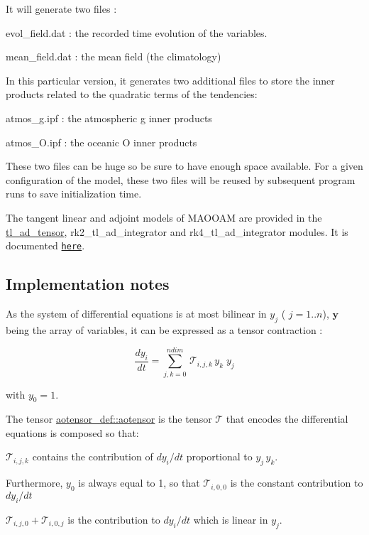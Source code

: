 It will generate two files \+:
\begin{DoxyItemize}
\item evol\+\_\+field.\+dat \+: the recorded time evolution of the variables.
\item mean\+\_\+field.\+dat \+: the mean field (the climatology)
\end{DoxyItemize}

In this particular version, it generates two additional files to store the inner products related to the quadratic terms of the tendencies\+:
\begin{DoxyItemize}
\item atmos\+\_\+g.\+ipf \+: the atmospheric g inner products
\item atmos\+\_\+\+O.\+ipf \+: the oceanic O inner products
\end{DoxyItemize}

These two files can be huge so be sure to have enough space available. For a given configuration of the model, these two files will be reused by subsequent program runs to save initialization time.

The tangent linear and adjoint models of M\+A\+O\+O\+AM are provided in the \hyperlink{namespacetl__ad__tensor}{tl\+\_\+ad\+\_\+tensor}, rk2\+\_\+tl\+\_\+ad\+\_\+integrator and rk4\+\_\+tl\+\_\+ad\+\_\+integrator modules. It is documented \href{./md_doc_tl_ad_doc.html}{\tt here}.





\subsection*{Implementation notes}

As the system of differential equations is at most bilinear in $y_j$ ( $j=1..n$), $\boldsymbol{y}$ being the array of variables, it can be expressed as a tensor contraction \+:

\[ \frac{d y_i}{dt} = \sum_{j,k=0}^{ndim} \, \mathcal{T}_{i,j,k} \, y_k \; y_j \]

with $y_0 = 1$.

The tensor \hyperlink{namespaceaotensor__def_a0dc43bc9294a18f2fe57b67489f1702f}{aotensor\+\_\+def\+::aotensor} is the tensor $\mathcal{T}$ that encodes the differential equations is composed so that\+:


\begin{DoxyItemize}
\item $\mathcal{T}_{i,j,k}$ contains the contribution of $dy_i/dt$ proportional to $ y_j \, y_k$.
\item Furthermore, $y_0$ is always equal to 1, so that $\mathcal{T}_{i,0,0}$ is the constant contribution to $dy_i/dt$
\item $\mathcal{T}_{i,j,0} + \mathcal{T}_{i,0,j}$ is the contribution to $dy_i/dt$ which is linear in $y_j$.
\end{DoxyItemize}

